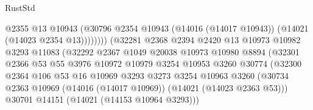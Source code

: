 \begin{lexlean}{RustStd}
\begin{coremodule}
                                            @2355
                                            @13
                                            @10943
                                            (@30796
                                              @2354
                                              @10943
                                              (@14016 (@14017 @10943))
                                              (@14021 (@14023 @2354 @13))))))))
                                  (@32281
                                    @2368
                                    @2394
                                    @2420
                                    @13
                                    @10973
                                    @10982
                                    @3293
                                    @11083
                                    (@32292
                                      @2367
                                      @1049
                                      @20038
                                      @10973
                                      @10980
                                      @8894
                                      (@32301
                                        @2366
                                        @53
                                        @55
                                        @3976
                                        @10972
                                        @10979
                                        @3254
                                        @10953
                                        @3260
                                        @30774
                                        (@32300
                                          @2364
                                          @106
                                          @53
                                          @16
                                          @10969
                                          @3293
                                          @3273
                                          @3254
                                          @10963
                                          @3260
                                          (@30734
                                            @2363
                                            @10969
                                            (@14016 (@14017 @10969))
                                            (@14021 (@14023 @2363 @53)))
                                          @30701
                                          @14151
                                          (@14021 (@14153 @10964 @3293)))

\end{coremodule}
\end{lexlean}
